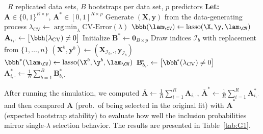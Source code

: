 \begin{algorithm}[!ht]
\caption{Bootstrap Stability Selection at a \emph{single} CV-chosen $\lambda$}
\label{alg:singlelambda}
\begin{algorithmic}[1]
\Require\ $R$ replicated data sets, $B$ bootstraps per data set,
          $p$ predictors
\Statex \textbf{Let:}
  $\mathbf A \in\{0,1\}^{R\times p}$, $\mathbf A^{\!*}\in[0,1]^{R\times p}$
%
  \State Generate $(\mathbf X,\mathbf y)$ from the data-generating process
  \State $\lambda_{\text{CV}}\leftarrow
         \operatorname*{arg\,min}_{\lambda}\text{CV‐Error}(\lambda)$
  \State $\bbh (\lam_{\CV}) \gets \text{lasso}(\X, \y, \lam_{\CV})$
  \State $\mathbf A_{i,\cdot}\gets\bigl[\bbh(\lambda_{\text{CV}})\neq 0\bigr]$
  \State Initialize $\mathbf B^{\!*}\gets\mathbf 0_{B\times p}$
                          
     \State Draw indices $\mathcal I_b$ with replacement from $\{1,\dots,n\}$
     \State $(\mathbf X^{b},\mathbf y^{b})\gets
            (\mathbf X_{\mathcal I_b,\cdot},\mathbf y_{\mathcal I_b})$
     \State $\bbh^* (\lam_{\CV}) \gets \text{lasso}(\X^{b}, \y^{b}, \lam_{\CV})$
     \State $\mathbf B^{\!*}_{b,\cdot}\gets
            \bigl[\bbh^{\!*}(\lambda_{\text{CV}})\neq 0\bigr]$
  \EndFor
  \State $\mathbf A^{\!*}_{i,\cdot}\gets
         \tfrac1B\sum_{b=1}^{B}\mathbf B^{\!*}_{b,\cdot}$
\EndFor
\end{algorithmic}
\end{algorithm}

After running the simulation, we computed $\bar{\mathbf A}\gets\tfrac1R\sum_{i=1}^{R}\mathbf A_{i,\cdot}$,  \; $\bar{\mathbf A}^{\!*}\gets\tfrac1R\sum_{i=1}^{R}\mathbf A^{\!*}_{i,\cdot}$ and then compared $\bar{\mathbf A}$ (prob.\ of being selected in the original fit) with $\bar{\mathbf A}^{\!*}$ (expected bootstrap stability) to evaluate how well the inclusion probabilities mirror single-$\lambda$ selection behavior. The results are presented in Table~\ref{tab:G1}.

\begin{table}[hbtp]
  \centering
  
  \caption{\label{tab:G1} Compares empirical and stability selection inclusion probabilities for the simulation described in Supplement~\ref{sup:stability} where 1000 datasets were generated with $n = 50$, $p = 500$, $\beta_{1-4} = (0.25, 0.5, 1, 2)$, and the rest of the parameters set equal to zero. ``Original'' provides the empirical selection probabilities for the 4 parameters while ``Bootstrap'' gives the bootstrap estimate for the selection probabilities.}
\end{table}

